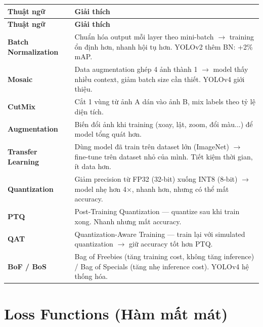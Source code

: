 \documentclass[12pt,a4paper]{report}
\begin{document}
\begin{longtable}{p{3.5cm}p{12cm}}
\toprule
\textbf{Thuật ngữ} & \textbf{Giải thích} \\
\midrule
\endfirsthead
\toprule
\textbf{Thuật ngữ} & \textbf{Giải thích} \\
\midrule
\endhead

\textbf{Batch Normalization} & Chuẩn hóa output mỗi layer theo mini-batch $\rightarrow$ training ổn định hơn, nhanh hội tụ hơn. YOLOv2 thêm BN: +2\% mAP. \\
\midrule
\textbf{Mosaic} & Data augmentation ghép 4 ảnh thành 1 $\rightarrow$ model thấy nhiều context, giảm batch size cần thiết. YOLOv4 giới thiệu. \\
\midrule
\textbf{CutMix} & Cắt 1 vùng từ ảnh A dán vào ảnh B, mix labels theo tỷ lệ diện tích. \\
\midrule
\textbf{Augmentation} & Biến đổi ảnh khi training (xoay, lật, zoom, đổi màu...) để model tổng quát hơn. \\
\midrule
\textbf{Transfer Learning} & Dùng model đã train trên dataset lớn (ImageNet) $\rightarrow$ fine-tune trên dataset nhỏ của mình. Tiết kiệm thời gian, ít data hơn. \\
\midrule
\textbf{Quantization} & Giảm precision từ FP32 (32-bit) xuống INT8 (8-bit) $\rightarrow$ model nhẹ hơn 4$\times$, nhanh hơn, nhưng có thể mất accuracy. \\
\midrule
\textbf{PTQ} & Post-Training Quantization --- quantize sau khi train xong. Nhanh nhưng mất accuracy. \\
\midrule
\textbf{QAT} & Quantization-Aware Training --- train lại với simulated quantization $\rightarrow$ giữ accuracy tốt hơn PTQ. \\
\midrule
\textbf{BoF / BoS} & Bag of Freebies (tăng training cost, không tăng inference) / Bag of Specials (tăng nhẹ inference cost). YOLOv4 hệ thống hóa. \\
\bottomrule
\end{longtable}

\section*{Loss Functions (Hàm mất mát)}
\end{document}
